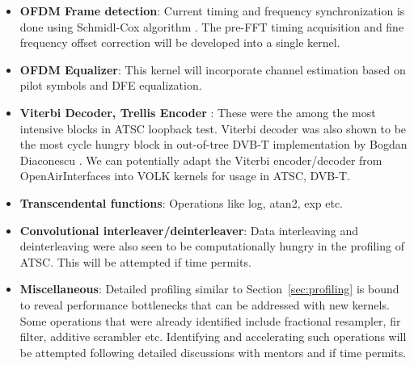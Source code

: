 \documentclass[a4paper,12pt,oneside]{article}
\begin{document}
\begin{itemize}
\item \textbf{OFDM Frame detection}: Current timing and frequency synchronization is done using Schmidl-Cox algorithm \cite{schmidl-cox}. The pre-FFT timing acquisition and fine frequency offset correction will be developed into a single kernel.
\item \textbf{OFDM Equalizer}: This kernel will incorporate channel estimation based on pilot symbols and DFE equalization.
\item \textbf{Viterbi Decoder, Trellis Encoder} : These were the among the most intensive blocks in ATSC loopback test. Viterbi decoder was also shown to be the most cycle hungry block in out-of-tree DVB-T implementation by Bogdan Diaconescu \cite{dvbt}. We can potentially adapt the Viterbi encoder/decoder from OpenAirInterfaces into VOLK kernels for usage in ATSC, DVB-T.
\item \textbf{Transcendental functions}: Operations like log, atan2, exp etc.
\item \textbf{Convolutional interleaver/deinterleaver}: Data interleaving and deinterleaving were also seen to be computationally hungry in the profiling of ATSC. This will be attempted if time permits. 
\item \textbf{Miscellaneous}: Detailed profiling similar to Section~\ref{sec:profiling} is bound to reveal performance bottlenecks that can be addressed with new kernels. Some operations that were already identified include fractional resampler, fir filter, additive scrambler etc. Identifying and accelerating such operations will be attempted following detailed discussions with mentors and if time permits.
\end{itemize}
\end{document}
